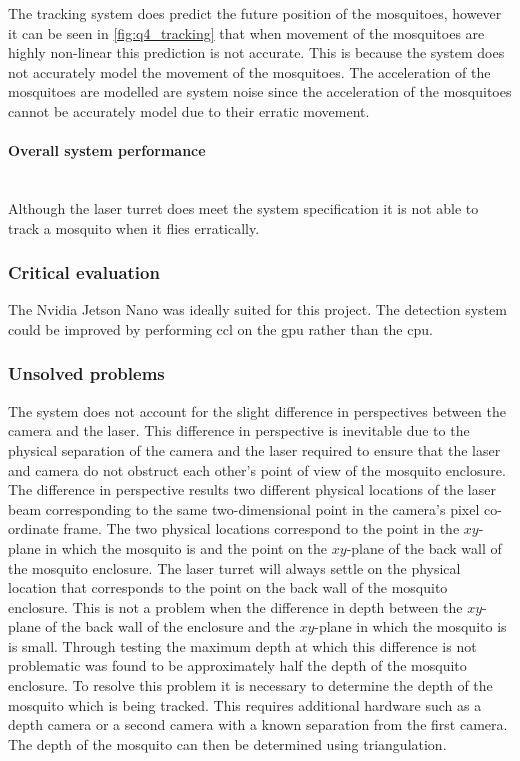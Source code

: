 The tracking system does predict the future position of the mosquitoes, however it can be seen in \autoref{fig:q4_tracking} that when movement of the mosquitoes are highly non-linear this prediction is not accurate. This is because the system does not accurately model the movement of the mosquitoes. The acceleration of the mosquitoes are modelled are system noise since the acceleration of the mosquitoes cannot be accurately model due to their erratic movement.

\paragraph{Overall system performance}\hfill\\
Although the laser turret does meet the system specification it is not able to track a mosquito when it flies erratically.

\subsubsection{Critical evaluation}
The Nvidia Jetson Nano was ideally suited for this project. The detection system could be improved by performing \gls{ccl} on the \gls{gpu} rather than the \gls{cpu}.

\subsubsection{Unsolved problems}\label{sec:unsolved_problems}
The system does not account for the slight difference in perspectives between the camera and the laser. This difference in perspective is inevitable due to the physical separation of the camera and the laser required to ensure that the laser and camera do not obstruct each other's point of view of the mosquito enclosure. The difference in perspective results two different physical locations of the laser beam corresponding to the same two-dimensional point in the camera's pixel co-ordinate frame. The two physical locations correspond to the point in the $xy$-plane in which the mosquito is and the point on the $xy$-plane of the back wall of the mosquito enclosure. The laser turret will always settle on the physical location that corresponds to the point on the back wall of the mosquito enclosure. This is not a problem when the difference in depth between the $xy$-plane of the back wall of the enclosure and the $xy$-plane in which the mosquito is is small. Through testing the maximum depth at which this difference is not problematic was found to be approximately half the depth of the mosquito enclosure. To resolve this problem it is necessary to determine the depth of the mosquito which is being tracked. This requires additional hardware such as a depth camera or a second camera with a known separation from the first camera. The depth of the mosquito can then be determined using triangulation.


